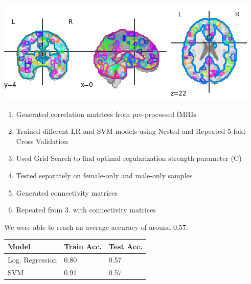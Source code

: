 \documentclass[landscape,a0paper,fontscale=0.285]{baposter} %
\newcommand{\compresslist}{ %
\setlength{\itemsep}{1pt}
\setlength{\parskip}{0pt}
\setlength{\parsep}{0pt}
}
\begin{document}
\begin{poster}
{\begin{multicols}{2}
\vspace{1em}
\begin{center}
\includegraphics[width=0.8\linewidth]{atlas}
\end{center}

\begin{enumerate}\compresslist
	\item Generated correlation matrices from pre-processed fMRIs
	\item Trained different LR and SVM models using Nested and Repeated 5-fold Cross Validation
	\item Used Grid Search to find optimal regularization strength parameter (C)
	\item Tested separately on female-only and male-only samples
	\item Generated connectivity matrices
	\item Repeated from $3.$ with connectivity matrices
\end{enumerate}


\vspace{1em}
We were able to reach an average accuracy of around 0.57.

\begin{center}
	\begin{tabular}{l l l}
		\toprule
		\textbf{Model} & \textbf{Train Acc.} & \textbf{Test Acc.}\\
		\midrule
		Log. Regression & 0.80 & 0.57 \\
		SVM & 0.91 & 0.57 \\
		\bottomrule
	\end{tabular}
\end{center}

\end{multicols}
}



\end{poster}
\end{document}
